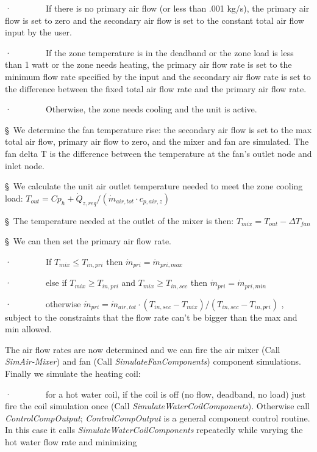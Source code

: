 ·~~~~~~~~If there is no primary air flow (or less than .001 kg/s), the primary air flow is set to zero and the secondary air flow is set to the constant total air flow input by the user.

·~~~~~~~~If the zone temperature is in the deadband or the zone load is less than 1 watt or the zone needs heating, the primary air flow rate is set to the minimum flow rate specified by the input and the secondary air flow rate is set to the difference between the fixed total air flow rate and the primary air flow rate.

·~~~~~~~~Otherwise, the zone needs cooling and the unit is active.

§~We determine the fan temperature rise: the secondary air flow is set to the max total air flow, primary air flow to zero, and the mixer and fan are simulated. The fan delta T is the difference between the temperature at the fan's outlet node and inlet node.

§~We calculate the unit air outlet temperature needed to meet the zone cooling load: \({T_{out}} = C{p_h} + {\dot Q_{z,req}}/({\dot m_{air,tot}}\cdot {c_{p,air,z}})\)

§~The temperature needed at the outlet of the mixer is then: \({T_{mix}} = {T_{out}} - \Delta {T_{fan}}\)

§~We can then set the primary air flow rate.

·~~~~~~~~If \({T_{mix}} \le {T_{in,pri}}\) then \({\dot m_{pri}} = {\dot m_{pri,max}}\)

·~~~~~~~~else if \({T_{mix}} \ge {T_{in,pri}}\) and \({T_{mix}} \ge {T_{in,sec}}\) then \({\dot m_{pri}} = {\dot m_{pri,min}}\)

·~~~~~~~~otherwise \({\dot m_{pri}} = {\dot m_{air,tot}}\cdot ({T_{in,sec}} - {T_{mix}})/({T_{in,sec}} - {T_{in,pri}})\) , subject to the constraints that the flow rate can't be bigger than the max and min allowed.

The air flow rates are now determined and we can fire the air mixer (Call \emph{SimAir-Mixer}) and fan (Call \emph{SimulateFanComponents}) component simulations. Finally we simulate the heating coil:

·~~~~~~~~for a hot water coil, if the coil is off (no flow, deadband, no load) just fire the coil simulation once (Call \emph{SimulateWaterCoilComponents}). Otherwise call \emph{ControlCompOutput}; \emph{ControlCompOutput} is a general component control routine. In this case it calls \emph{SimulateWaterCoilComponents} repeatedly while varying the hot water flow rate and minimizing

